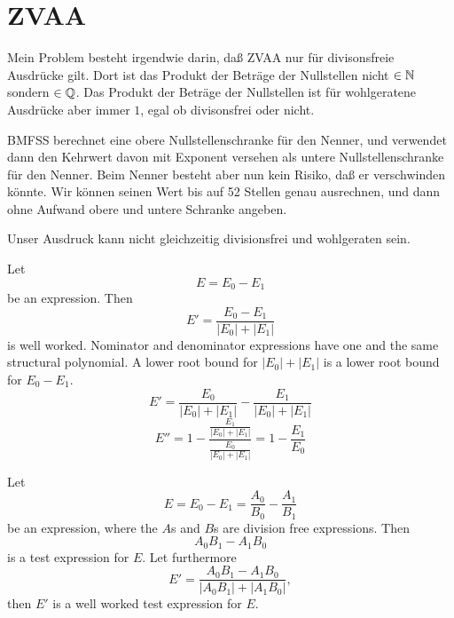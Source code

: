\section{ZVAA}

Mein Problem besteht irgendwie darin, 
daß ZVAA nur für divisonsfreie Ausdrücke gilt.
Dort ist das Produkt der Beträge der Nullstellen nicht $\in\mathbb{N}$
sondern $\in\mathbb{Q}$.
Das Produkt der Beträge der Nullstellen ist für 
wohlgeratene Ausdrücke aber immer $1$, 
egal ob divisonsfrei oder nicht.

BMFSS berechnet eine obere Nullstellenschranke für den Nenner,
und verwendet dann den Kehrwert davon mit Exponent versehen
als untere Nullstellenschranke für den Nenner.
Beim Nenner besteht aber nun kein Risiko, 
daß er verschwinden könnte. 
Wir können seinen Wert bis auf 52 Stellen genau ausrechnen,
und dann ohne Aufwand obere und untere Schranke angeben.

Unser Ausdruck kann nicht gleichzeitig divisionsfrei und
wohlgeraten sein.

Let 
\begin{equation}
  E = E_0 - E_1
\end{equation}
be an expression.
Then
\begin{equation}
  E' = \frac{E_0 - E_1}{|E_0| + |E_1|}
\end{equation}
is well worked.
Nominator and denominator expressions 
have one and the same structural polynomial.
A lower root bound for $|E_0| + |E_1|$ is
a lower root bound for $E_0 - E_1$.
\begin{equation}
  E' = \frac{E_0}{|E_0| + |E_1|}-\frac{E_1}{|E_0| + |E_1|}
\end{equation}
\begin{equation}
  E'' = 1-\frac{\frac{E_1}{|E_0| + |E_1|}}{\frac{E_0}{|E_0| + |E_1|}}
      = 1-\frac{E_1}{E_0}
\end{equation}



Let 
\begin{equation}
  E = E_0 - E_1 = \frac{A_0}{B_0}-\frac{A_1}{B_1}
\end{equation}
be an expression, 
where the $A$s and $B$s are division free expressions.
Then 
\begin{equation}
  A_0B_1 - A_1B_0
\end{equation}
is a test expression for $E$.
Let furthermore
\begin{equation}
  E' = \frac{A_0B_1 - A_1B_0}{|A_0B_1| + |A_1B_0|},
\end{equation}
then $E'$ is a well worked test expression for $E$.


